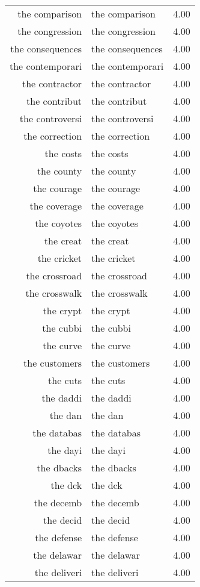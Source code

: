 \begin{table}[ht]
\begin{tabular}{rlr}
  the comparison & the comparison & 4.00 \\ 
  the congression & the congression & 4.00 \\ 
  the consequences & the consequences & 4.00 \\ 
  the contemporari & the contemporari & 4.00 \\ 
  the contractor & the contractor & 4.00 \\ 
  the contribut & the contribut & 4.00 \\ 
  the controversi & the controversi & 4.00 \\ 
  the correction & the correction & 4.00 \\ 
  the costs & the costs & 4.00 \\ 
  the county & the county & 4.00 \\ 
  the courage & the courage & 4.00 \\ 
  the coverage & the coverage & 4.00 \\ 
  the coyotes & the coyotes & 4.00 \\ 
  the creat & the creat & 4.00 \\ 
  the cricket & the cricket & 4.00 \\ 
  the crossroad & the crossroad & 4.00 \\ 
  the crosswalk & the crosswalk & 4.00 \\ 
  the crypt & the crypt & 4.00 \\ 
  the cubbi & the cubbi & 4.00 \\ 
  the curve & the curve & 4.00 \\ 
  the customers & the customers & 4.00 \\ 
  the cuts & the cuts & 4.00 \\ 
  the daddi & the daddi & 4.00 \\ 
  the dan & the dan & 4.00 \\ 
  the databas & the databas & 4.00 \\ 
  the dayi & the dayi & 4.00 \\ 
  the dbacks & the dbacks & 4.00 \\ 
  the dck & the dck & 4.00 \\ 
  the decemb & the decemb & 4.00 \\ 
  the decid & the decid & 4.00 \\ 
  the defense & the defense & 4.00 \\ 
  the delawar & the delawar & 4.00 \\ 
  the deliveri & the deliveri & 4.00 \\ 

\end{tabular}
\end{table}
